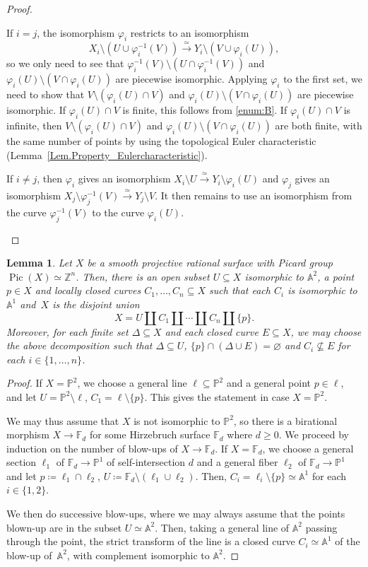 \documentclass[JEP,XML,SOM,Unicode,NoFloatCountersInSection,published]{cedram}
\newtheorem{lemma}{Lemma}[section]
\theoremstyle{definition}
\newcommand\iso{\stackrel{\simeq}{\longrightarrow}}
\newcommand\A{{\mathbb A}}\let\AA\A
\newcommand\p{{\mathbb P}}\let\PP\p
\newcommand\Z{{\mathbb Z}}\let\ZZ\Z
\newcommand\FF{{\mathbb F}}
\DeclareMathOperator{\Pic}{Pic}
\begin{document}
\begin{proof}
\begin{enumerate}
If $i=j$, the isomorphism $\varphi_i$ restricts to an isomorphism
\[
X_i\setminus (U\cup \varphi_i^{-1} (V)) \iso Y_i\setminus (V\cup \varphi_i(U)),
\]
so we only need to see that $\varphi_i^{-1} (V)\setminus (U\cap \varphi_i^{-1} (V))$ and $\varphi_i(U)\setminus (V\cap \varphi_i(U))$ are piecewise isomorphic. Applying $\varphi_i$ to the first set, we need to show that $V\setminus (\varphi_i(U)\cap V)$ and $\varphi_i(U)\setminus (V\cap \varphi_i(U))$ are piecewise isomorphic. If $\varphi_i(U)\cap V$ is finite, this follows from \eqref{enum:B}. If $\varphi_i(U)\cap V$ is infinite, then $V\setminus (\varphi_i(U)\cap V)$ and $\varphi_i(U)\setminus (V\cap \varphi_i(U))$ are both finite, with the same number of points
by using the topological Euler characteristic (Lemma~\ref{Lem.Property_Eulercharacteristic}).

If $i\neq j$, then $\varphi_i$ gives an isomorphism $X_i\setminus U\iso Y_i\setminus \varphi_i(U)$ and $\varphi_j$ gives an isomorphism $X_j\setminus \varphi_{j}^{-1}(V)\iso Y_j\setminus V$. It then remains to use an isomorphism from the curve $\varphi_j^{-1} (V)$ to the curve $\varphi_i(U)$.\qedhere
\end{enumerate}
\end{proof}

\begin{lemma}\label{Lem:SMoothRatDecomposition}
Let $X$ be a smooth projective rational surface with
Picard group $\Pic(X)\simeq \Z^n$. Then, there is an open subset $U\subseteq X$ isomorphic to $\A^2$, a point $p\in X$ and locally closed curves $C_1,\ldots,C_n\subseteq X$ such that each $C_i$ is isomorphic to~$\A^1$ and~$X$ is the disjoint union
\[
X=U \amalg C_1\amalg \cdots \amalg C_n \amalg \{p\}.
\]
Moreover, for each finite set $\Delta\subseteq X$ and each closed curve $E\subseteq X$, we may choose the above decomposition such that $\Delta\subseteq U$, $\{p\}\cap (\Delta \cup E)=\varnothing$ and $C_i\not\subseteq E$ for each $i\in \{1,\ldots,n\}$.
\end{lemma}
\begin{proof}
If $X=\p^2$, we choose a general line $\ell\subseteq \p^2$ and a general point $p\in \ell$, and let $U=\p^2\setminus \ell$, $C_1=\ell\setminus \{p\}$. This gives the statement in case $X = \PP^2$.

We may thus assume that $X$ is not isomorphic to $\p^2$, so there is a birational morphism $X\to \mathbb{F}_d$ for some Hirzebruch surface $\mathbb{F}_d$ where $d \geq 0$.
We proceed by induction on the number of blow-ups of $X \to \FF_d$. If $X = \FF_d$, we choose a general section $\ell_1$
of $\FF_d \to \PP^1$ of self-intersection $d$ and a general fiber $\ell_2$ of $\FF_d \to \PP^1$
and let $p \coloneqq \ell_1 \cap \ell_2$, $U \coloneqq \FF_d \setminus (\ell_1 \cup \ell_2)$.
Then, $C_i=\ell_i\setminus \{p\}\simeq \A^1$ for each $i\in \{1,2\}$.

We then do successive blow-ups, where we may always assume that the points blown-up are in the subset $U\simeq \A^2$. Then, taking a general line of $\A^2$ passing through the point, the strict transform of the line is a closed curve $C_i\simeq \A^1$ of the blow-up of~$\A^2$, with complement isomorphic to $\A^2$.
\end{proof}
\end{document}
